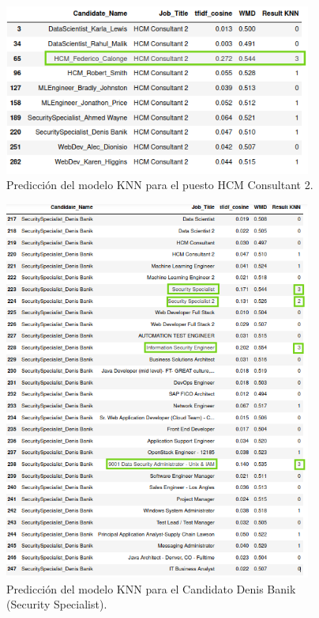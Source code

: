 \documentclass[12pt,a4paper]{article}
\begin{document}
\begin{sloppypar}
\begin{figure}[H]   
\centering
\includegraphics[width=0.9\textwidth]{images/implementacion_5/Pred_HCM_Consultant_2.png}
\caption{Predicción del modelo KNN para el puesto HCM Consultant 2.}
\label{fig:Pred_HCM_Consultant_2}
\end{figure}

\begin{figure}[H]   
\centering
\includegraphics[width=0.9\textwidth]{images/implementacion_5/prediccion_denis.png}
\caption{Predicción del modelo KNN para el Candidato Denis Banik (Security Specialist).}
\label{fig:prediccion_denis}
\end{figure}


\end{sloppypar}
\end{document}
